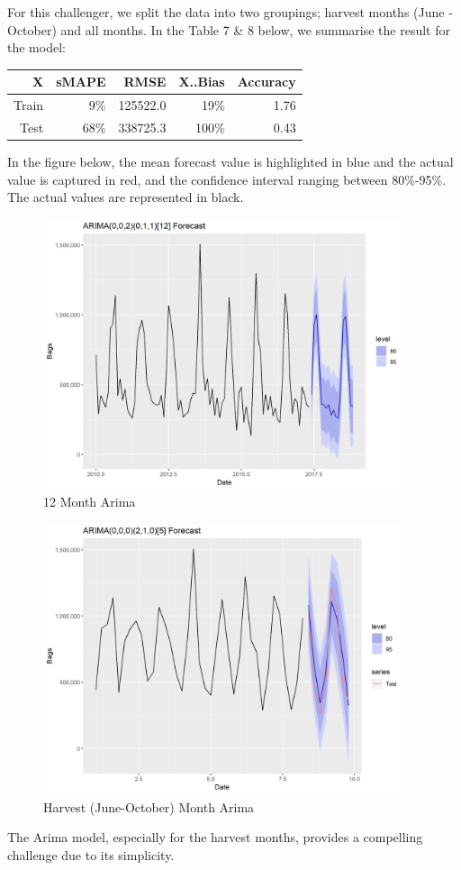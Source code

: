 \documentclass[12pt,oneside]{chicagocapstone}
\begin{document}
For this challenger, we split the data into two groupings; harvest
months (June -October) and all months. In the Table 7 \& 8 below, we
summarise the result for the model:
\begin{longtable}[]{@{}rrrrr@{}}
\toprule
X & sMAPE & RMSE & X..Bias & Accuracy\tabularnewline
\midrule
\endhead
Train & 9\% & 125522.0 & 19\% & 1.76\tabularnewline
Test & 68\% & 338725.3 & 100\% & 0.43\tabularnewline
\bottomrule
\end{longtable}
In the figure below, the mean forecast value is highlighted in blue and
the actual value is captured in red, and the confidence interval ranging
between 80\%-95\%. The actual values are represented in black.
\begin{figure}

{\centering \includegraphics[width=400px]{figure/Arima_12month} 

}

\caption{12 Month Arima}\label{fig:arima-12}
\end{figure}
\begin{figure}

{\centering \includegraphics[width=400px]{figure/HarvestArima} 

}

\caption{Harvest (June-October) Month Arima}\label{fig:arima-5}
\end{figure}
The Arima model, especially for the harvest months, provides a
compelling challenge due to its simplicity.
\end{document}
